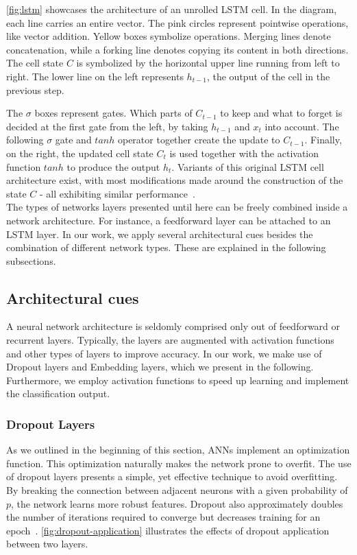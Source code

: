\autoref{fig:lstm} showcases the architecture of an unrolled LSTM cell. In the diagram, each line carries an entire vector. The pink circles represent pointwise operations, like vector addition. Yellow boxes symbolize operations. Merging lines denote concatenation, while a forking line denotes copying its content in both directions. The cell state $C$ is symbolized by the horizontal upper line running from left to right. The lower line on the left represents $h_{t-1}$, the output of the cell in the previous step.

The $\sigma$ boxes represent gates. Which parts of $C_{t-1}$ to keep and what to forget is decided at the first gate from the left, by taking $h_{t-1}$ and $x_t$ into account. The following $\sigma$ gate and $tanh$ operator together create the update to $C_{t-1}$. Finally, on the right, the updated cell state $C_t$ is used together with the activation function $tanh$ to produce the output $h_t$. Variants of this original LSTM cell architecture exist, with most modifications made around the construction of the state $C$ - all exhibiting similar performance~\cite{greff2017lstm}.\\

The types of networks layers presented until here can be freely combined inside a network architecture.
For instance, a feedforward layer can be attached to an LSTM layer.
In our work, we apply several architectural cues besides the combination of different network types.
These are explained in the following subsections.

\subsection{Architectural cues}\label{sec:background:cues}
A neural network architecture is seldomly comprised only out of feedforward or recurrent layers.
Typically, the layers are augmented with activation functions and other types of layers to improve accuracy.
In our work, we make use of Dropout layers and Embedding layers, which we present in the following.
Furthermore, we employ activation functions to speed up learning and implement the classification output.

\subsubsection*{Dropout Layers}
As we outlined in the beginning of this section, ANNs implement an optimization function.
This optimization naturally makes the network prone to overfit.
The use of dropout layers presents a simple, yet effective technique to avoid overfitting.
By breaking the connection between adjacent neurons with a given probability of $p$, the network learns more robust features.
Dropout also approximately doubles the number of iterations required to converge but decreases training for an epoch~\cite{srivastava2014dropout}.
\autoref{fig:dropout-application} illustrates the effects of dropout application between two layers.

